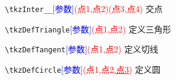 \documentclass[a4paper,12pt]{article}
\begin{document}
\begin{CJK}{UTF8}{gbsn}
\begin{commandbox}
    \verb"\tkzInter__"\textcolor{blue}{[参数]}\textcolor{red}{(点1,点2)(点3,点4)}
    \tcblower
    交点
\end{commandbox}

\begin{tcbraster}[raster columns=3,height=10cm]
\end{tcbraster}

\begin{commandbox}
    \verb"\tkzDefTriangle"\textcolor{blue}{[参数]}\textcolor{red}{(点1,点2)}
    \tcblower
    定义三角形
\end{commandbox}

\begin{tcbraster}[raster columns=3]
\end{tcbraster}

\begin{commandbox}
    \verb"\tkzDefTangent"\textcolor{blue}{[参数]}\textcolor{red}{(点1,点2)}
    \tcblower
    定义切线
\end{commandbox}

\begin{tcbraster}[raster columns=3,height=4.5cm]
\end{tcbraster}

\begin{commandbox}
    \verb"\tkzDefCircle"\textcolor{blue}{[参数]}\textcolor{red}{(点1,点2\underline{,点3})}
    \tcblower
    定义圆
\end{commandbox}


\end{CJK}
\end{document}
